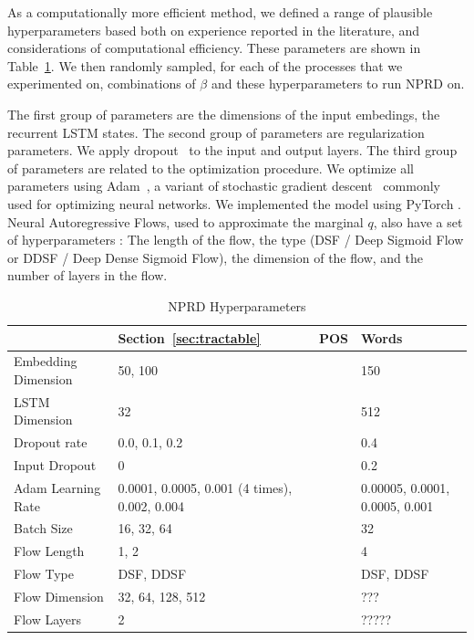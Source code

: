 \documentclass[11pt,letterpaper]{article}
\begin{document}
As a computationally more efficient method, we defined a range of plausible hyperparameters based both on experience reported in the literature, and considerations of computational efficiency.
These parameters are shown in Table~\ref{tab:nprd-hyperparameters}.
We then randomly sampled, for each of the processes that we experimented on, combinations of $\beta$ and these hyperparameters to run NPRD on.

The first group of parameters are the dimensions of the input embedings, the recurrent LSTM states.
The second group of parameters are regularization parameters.
We apply dropout~\citep{srivastava-dropout:-2014} to the input and output layers.
The third group of parameters are related to the optimization procedure.
We optimize all parameters using Adam~\citep{kingma-adam:-2014}, a variant of stochastic gradient descent~\citep{robbins1951stochastic} commonly used for optimizing neural networks.
We implemented the model using PyTorch \citep{paszke2017automatic}.
Neural Autoregressive Flows, used to approximate the marginal $q$, also have a set of hyperparameters \citep{huang-neural-2018}: The length of the flow, the type (DSF / Deep Sigmoid Flow or  DDSF / Deep Dense Sigmoid Flow), the dimension of the flow, and the number of layers in the flow.

\begin{table}
\begin{tabular}{l||lll}
	& Section~\ref{sec:tractable} &   POS & Words\\ \hline\hline
	Embedding Dimension & 50, 100 &       &  150      \\
	LSTM Dimension & 32           &       &    512     \\ \hline
	Dropout rate & 0.0, 0.1, 0.2  &       &      0.4     \\
	Input Dropout & 0  &       &        0.2             \\ \hline
	Adam Learning Rate & 0.0001, 0.0005, 0.001 (4 times), 0.002, 0.004  &       &       0.00005, 0.0001, 0.0005, 0.001     \\
	Batch Size & 16, 32, 64  &       &       32          \\ \hline
	Flow Length & 1, 2  &       &          4              \\
	Flow Type & DSF, DDSF  &       &       DSF, DDSF             \\
	Flow Dimension & 32, 64, 128, 512  &       &    ???        \\
	Flow Layers & 2  &       &                 ?????          \\
\end{tabular}
	\caption{NPRD Hyperparameters}\label{tab:nprd-hyperparameters}
\end{table}
\end{document}
